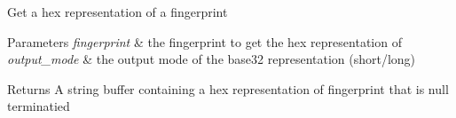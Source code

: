 Get a hex representation of a fingerprint


\begin{DoxyParams}{Parameters}
{\em fingerprint} & the fingerprint to get the hex representation of \\
\hline
{\em output\+\_\+mode} & the output mode of the base32 representation (short/long) \\
\hline
\end{DoxyParams}
\begin{DoxyReturn}{Returns}
A string buffer containing a hex representation of \textquotesingle{}fingerprint\textquotesingle{} that is null terminatied 
\end{DoxyReturn}
